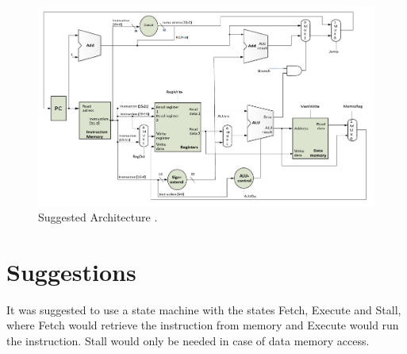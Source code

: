 \begin{figure}[ht]
    \centering
    \includegraphics[scale=0.3]{figures/suggestedarchitecture.png}
    \caption{\label{fig:sugarchi}Suggested Architecture \cite[p.115]{lab-compendium}.}
\end{figure}

\section{Suggestions}
It was suggested to use a state machine with the states Fetch, Execute and Stall, where Fetch would retrieve the instruction from memory and Execute would run the instruction. Stall would only be needed in case of data memory access.
